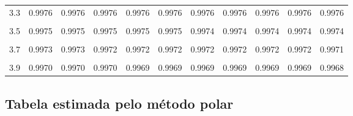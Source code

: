 \documentclass[
]{article}
\begin{document}
\begin{longtable}[l]{lcccccccccc}
3.3 & 0.9976 & 0.9976 & 0.9976 & 0.9976 & 0.9976 & 0.9976 & 0.9976 & 0.9976 & 0.9976 & 0.9976\\
\cellcolor{gray!15}{3.4} & \cellcolor{gray!15}{0.9976} & \cellcolor{gray!15}{0.9976} & \cellcolor{gray!15}{0.9976} & \cellcolor{gray!15}{0.9975} & \cellcolor{gray!15}{0.9975} & \cellcolor{gray!15}{0.9975} & \cellcolor{gray!15}{0.9975} & \cellcolor{gray!15}{0.9975} & \cellcolor{gray!15}{0.9975} & \cellcolor{gray!15}{0.9975}\\
3.5 & 0.9975 & 0.9975 & 0.9975 & 0.9975 & 0.9975 & 0.9974 & 0.9974 & 0.9974 & 0.9974 & 0.9974\\
\cellcolor{gray!15}{3.6} & \cellcolor{gray!15}{0.9974} & \cellcolor{gray!15}{0.9974} & \cellcolor{gray!15}{0.9974} & \cellcolor{gray!15}{0.9974} & \cellcolor{gray!15}{0.9973} & \cellcolor{gray!15}{0.9973} & \cellcolor{gray!15}{0.9973} & \cellcolor{gray!15}{0.9973} & \cellcolor{gray!15}{0.9973} & \cellcolor{gray!15}{0.9973}\\
3.7 & 0.9973 & 0.9973 & 0.9972 & 0.9972 & 0.9972 & 0.9972 & 0.9972 & 0.9972 & 0.9972 & 0.9971\\
\cellcolor{gray!15}{3.8} & \cellcolor{gray!15}{0.9971} & \cellcolor{gray!15}{0.9971} & \cellcolor{gray!15}{0.9971} & \cellcolor{gray!15}{0.9971} & \cellcolor{gray!15}{0.9971} & \cellcolor{gray!15}{0.9971} & \cellcolor{gray!15}{0.9970} & \cellcolor{gray!15}{0.9970} & \cellcolor{gray!15}{0.9970} & \cellcolor{gray!15}{0.9970}\\
3.9 & 0.9970 & 0.9970 & 0.9970 & 0.9969 & 0.9969 & 0.9969 & 0.9969 & 0.9969 & 0.9969 & 0.9968\\*
\end{longtable}

\newpage

\hypertarget{tabela-estimada-pelo-muxe9todo-polar}{%
\subsection{Tabela estimada pelo método
polar}\label{tabela-estimada-pelo-muxe9todo-polar}}
\end{document}
